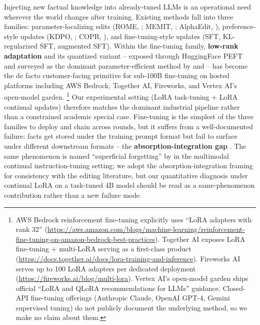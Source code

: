 \documentclass[11pt]{article}
\begin{document}
Injecting new factual knowledge into already-tuned LLMs is an operational
need wherever the world changes after training. Existing methods fall into
three families: parameter-localizing edits
(ROME, \citealp{meng2022rome}; MEMIT, \citealp{meng2023memit}; AlphaEdit,
\citealp{fang2024alphaedit}),
preference-style updates (KDPO, \citealp{rozner2024kdpo};
COPR, \citealp{zhang2025copr}), and fine-tuning-style updates (SFT,
KL-regularized SFT, augmented SFT). Within the fine-tuning family,
\textbf{low-rank adaptation} \citep[LoRA;][]{hu2021lora} and its quantized
variant \citep[QLoRA;][]{dettmers2023qlora} -- exposed through HuggingFace
PEFT \citep{mangrulkar2022peft} and surveyed as the dominant
parameter-efficient method by \citet{han2024peft} and
\citet{lialin2023scaling} -- has become the de facto customer-facing
primitive for sub-100B fine-tuning on hosted platforms including AWS
Bedrock, Together AI, Fireworks, and Vertex AI's open-model garden.%
\footnote{AWS Bedrock reinforcement fine-tuning explicitly uses ``LoRA
adapters with rank 32''
(\url{https://aws.amazon.com/blogs/machine-learning/reinforcement-fine-tuning-on-amazon-bedrock-best-practices}).
Together AI exposes LoRA fine-tuning + multi-LoRA serving as a first-class
product (\url{https://docs.together.ai/docs/lora-training-and-inference}).
Fireworks AI serves up to 100 LoRA adapters per dedicated deployment
(\url{https://fireworks.ai/blog/multi-lora}). Vertex AI's open-model
garden ships official ``LoRA and QLoRA recommendations for LLMs''
guidance. Closed-API fine-tuning offerings (Anthropic Claude, OpenAI
GPT-4, Gemini supervised tuning) do not publicly document the underlying
method, so we make no claim about them.}
Our experimental setting (LoRA task-tuning + LoRA continual updates)
therefore matches the dominant industrial pipeline rather than a
constrained academic special case. Fine-tuning is the simplest of the
three families to deploy and chain across rounds, but it suffers from a
well-documented failure: facts get stored under the training prompt
format but fail to surface under different downstream formats -- the
\textbf{absorption-integration gap} \citep{berglund2023reversal,
allenzhu2023knowledge, cohen2023ripple, zhong2023mquake}. The same
phenomenon is named ``superficial forgetting'' by \citet{chen2025sefe} in
the multimodal continual instruction-tuning setting; we adopt the
absorption-integration framing for consistency with the editing
literature, but our quantitative diagnosis under continual LoRA on a
task-tuned 4B model should be read as a same-phenomenon contribution
rather than a new failure mode.
\end{document}
